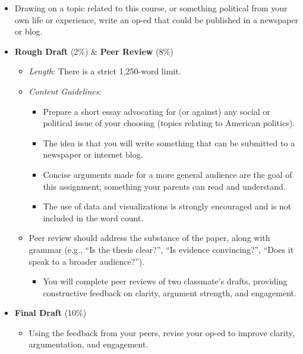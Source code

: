 \documentclass[]{tufte-handout}
\providecommand{\tightlist}{%
  \setlength{\itemsep}{0pt}\setlength{\parskip}{0pt}}
\begin{document}
\begin{itemize}
\tightlist
\item
  Drawing on a topic related to this course, or something political from
  your own life or experience, write an op-ed that could be published in
  a newspaper or blog.
\item
  \textbf{Rough Draft} (2\%) \& \textbf{Peer Review} (8\%)

  \begin{itemize}
  \tightlist
  \item
    \emph{Length}: There is a strict 1,250-word limit.
  \item
    \emph{Content Guidelines}:

    \begin{itemize}
    \tightlist
    \item
      Prepare a short essay advocating for (or against) any social or
      political issue of your choosing (topics relating to American
      politics).
    \item
      The idea is that you will write something that can be submitted to
      a newspaper or internet blog.
    \item
      Concise arguments made for a more general audience are the goal of
      this assignment; something your parents can read and understand.
    \item
      The use of data and visualizations is strongly encouraged and is
      not included in the word count.
    \end{itemize}
  \item
    Peer review should address the substance of the paper, along with
    grammar (e.g., ``Is the thesis clear?'', ``Is evidence
    convincing?'', ``Does it speak to a broader audience?'').

    \begin{itemize}
    \tightlist
    \item
      You will complete peer reviews of two classmate's drafts,
      providing constructive feedback on clarity, argument strength, and
      engagement.
    \end{itemize}
  \end{itemize}
\item
  \textbf{Final Draft} (10\%)

  \begin{itemize}
  \tightlist
  \item
    Using the feedback from your peers, revise your op-ed to improve
    clarity, argumentation, and engagement.
  \end{itemize}
\end{itemize}
\end{document}
